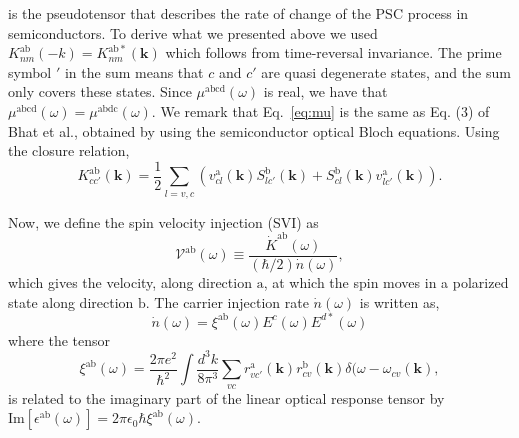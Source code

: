 \documentclass[floatfix,prb,aps,superscriptaddress,showpacs,11pt,preprint,letterpaper]{revtex4}
\begin{document}
is the pseudotensor that describes the rate of change of the  PSC process in
semiconductors. To derive what we presented above we used
$K^{\mathrm{ab}}_{nm}({\mathbf -k}) = K^{\mathrm{ab*}}_{nm}({\mathbf k})$ which
follows from time-reversal invariance. The prime symbol $'$ in the sum means
that $c$ and $c'$ are quasi degenerate states, and the sum only covers these
states. Since $\mu^{\mathrm{abcd}}(\omega)$ is real, we have that
$\mu^{\mathrm{abcd}}(\omega) = \mu^{\mathrm{abdc}}(\omega)$. We remark that
Eq.~\eqref{eq:mu} is the same as Eq. (3) of Bhat et al.\cite{bhatPRL05},
obtained by using the semiconductor optical Bloch equations. Using the closure
relation,
\begin{equation}
K^{\mathrm{ab}}_{cc'}({\mathbf k}) = 
\frac{1}{2} \sum_{l=v,c}
\left(v^{\mathrm{a}}_{cl}({\mathbf k})S^{\mathrm{b}}_{lc'}({\mathbf k})
+S^{\mathrm{b}}_{cl}({\mathbf k}) v^{\mathrm{a}}_{lc'}({\mathbf k})
\right)
.
\label{eq:velspimatelem}
\end{equation}

Now, we define the spin velocity injection (SVI) as
\begin{equation}\label{eq:vab-w}
\mathcal{V}^{\mathrm{ab}}(\omega) \equiv
\frac{\dot{K}^{\mathrm{ab}}(\omega)}{(\hbar/2) \dot{n}(\omega)},
\end{equation}  
which gives the velocity, along direction $\mathrm{a}$, at which the spin moves
in a polarized state along direction $\mathrm{b}$. The carrier injection rate
$\dot n(\omega)$ is written as,\cite{nastosPRB05}
\begin{equation}
\dot{n}(\omega) =
\xi^{\mathrm{ab}}(\omega) E^{c }(\omega) E^{d*}(\omega)
\label{eq:dotn}
\end{equation}
where the tensor 
\begin{equation}\label{eq:xi}
\xi^{\mathrm{ab}}(\omega) =
\frac{2\pi e^{2}}{\hbar^{2}} \int 
\frac{d^{3}k}{8 \pi^{3}} \sum_{vc}
r^{\mathrm{a}}_{vc'}({\mathbf k})  
r^{\mathrm{b}}_{cv }({\mathbf k})  
\delta(\omega-\omega_{cv}({\mathbf k}) 
, 
\end{equation}
is related to the imaginary part of the linear optical response tensor by
$\mathrm{Im} [\epsilon^{\mathrm{a}\mathrm{b}}(\omega)] =
2\pi\epsilon_0\hbar\xi^{\mathrm{a}\mathrm{b}}(\omega)$.
\end{document}
